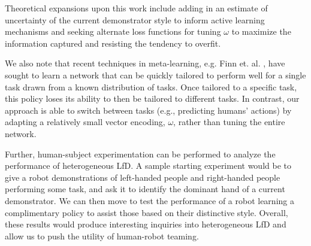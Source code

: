 \documentclass[conference]{IEEEtran}
\begin{document}
\par Theoretical expansions upon this work include adding in an estimate of uncertainty of the current demonstrator style to inform active learning mechanisms and seeking alternate loss functions for tuning $\omega$ to maximize the information captured and resisting the tendency to overfit. 

\par We also note that recent techniques in meta-learning, e.g. Finn et. al. \cite{finn2017model}, have sought to learn a network that can be quickly tailored to perform well for a single task drawn from a known distribution of tasks. Once tailored to a specific task, this policy loses its ability to then be tailored to different tasks. In contrast, our approach is able to switch between tasks (e.g., predicting humans' actions) by adapting a relatively small vector encoding, $\omega$, rather than tuning the entire network. 

\par Further, human-subject experimentation can be performed to analyze the performance of heterogeneous LfD. A sample starting experiment would be to give a robot demonstrations of left-handed people and right-handed people performing some task, and ask it to identify the dominant hand of a current demonstrator. We can then move to test the performance of a robot learning a complimentary policy to assist those based on their distinctive style. Overall, these results would produce interesting inquiries into heterogeneous LfD and allow us to push the utility of human-robot teaming.




\newpage

{}
\end{document}
